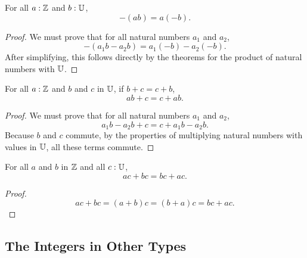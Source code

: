 \documentclass[../../math.tex]{subfiles}
\begin{document}
\begin{theorem}
    For all $a : \mathbb{Z}$ and $b : \mathbb{U}$,
    \[
        -(ab) = a(-b).
    \]
\end{theorem}
\begin{proof}
    We must prove that for all natural numbers $a_1$ and $a_2$,
    \[
        -(a_1b - a_2b) = a_1(-b) - a_2(-b).
    \]
    After simplifying, this follows directly by the theorems for the product of
    natural numbers with $\mathbb{U}$.
\end{proof}

\begin{theorem}
    For all $a : \mathbb{Z}$ and $b$ and $c$ in $\mathbb{U}$, if $b + c = c + b$,
    \[
        ab + c = c + ab.
    \]
\end{theorem}
\begin{proof}
    We must prove that for all natural numbers $a_1$ and $a_2$,
    \[
        a_1b - a_2b + c = c + a_1b - a_2b.
    \]
    Because $b$ and $c$ commute, by the properties of multiplying natural
    numbers with values in $\mathbb{U}$, all these terms commute.
\end{proof}

\begin{theorem}
    For all $a$ and $b$ in $\mathbb{Z}$ and all $c : \mathbb{U}$,
    \[
        ac + bc = bc + ac.
    \]
\end{theorem}
\begin{proof}
    \[
        ac + bc = (a + b)c = (b + a)c = bc + ac.
    \]
\end{proof}

\subsection{The Integers in Other Types}
\end{document}
